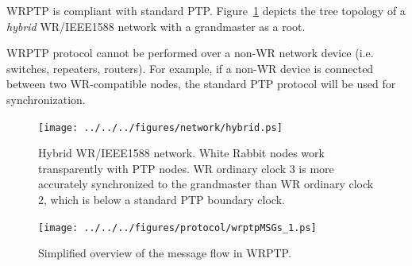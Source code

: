 \documentclass[a4paper, 12pt]{article}
\begin{document}
WRPTP is compliant with standard PTP. Figure~\ref{fig:hybrid-network} depicts the tree topology 
of a \emph{hybrid} WR/IEEE1588 network with a grandmaster as a root. 

WRPTP protocol cannot be performed over a non-WR network device (i.e. switches, repeaters, routers). 
For example, if a non-WR device is connected between two WR-compatible nodes, 
the standard PTP protocol will be used for synchronization. 


\begin{figure}[ht!]
  \centering
  \texttt{[image: ../../../figures/network/hybrid.ps]}
  \caption{Hybrid WR/IEEE1588 network. White Rabbit nodes work
    transparently with PTP nodes. WR ordinary clock 3 is more accurately
      synchronized to the grandmaster than WR ordinary clock 2, which
      is below a standard PTP boundary clock.}
  \label{fig:hybrid-network}
\end{figure}


\begin{figure}[ht!]
  \centering
  \texttt{[image: ../../../figures/protocol/wrptpMSGs\_1.ps]}
  \caption{Simplified overview of the message flow in WRPTP.}
  \label{fig:wrptpMSGs}
\end{figure}

\newpage 
\end{document}
